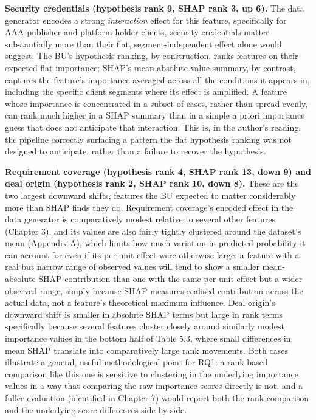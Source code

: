 \textbf{Security credentials (hypothesis rank 9, SHAP rank 3, up 6).}
The data generator encodes a strong \emph{interaction} effect for this
feature, specifically for AAA-publisher and platform-holder clients,
security credentials matter substantially more than their flat,
segment-independent effect alone would suggest. The BU's hypothesis
ranking, by construction, ranks features on their expected flat
importance; SHAP's mean-absolute-value summary, by contrast, captures
the feature's importance averaged across all the conditions it appears
in, including the specific client segments where its effect is
amplified. A feature whose importance is concentrated in a subset of
cases, rather than spread evenly, can rank much higher in a SHAP summary
than in a simple a priori importance guess that does not anticipate that
interaction. This is, in the author's reading, the pipeline correctly
surfacing a pattern the flat hypothesis ranking was not designed to
anticipate, rather than a failure to recover the hypothesis.

\textbf{Requirement coverage (hypothesis rank 4, SHAP rank 13, down 9)
and deal origin (hypothesis rank 2, SHAP rank 10, down 8).} These are
the two largest downward shifts, features the BU expected to matter
considerably more than SHAP finds they do. Requirement coverage's
encoded effect in the data generator is comparatively modest relative to
several other features (Chapter 3), and its values are also fairly
tightly clustered around the dataset's mean (Appendix A), which limits
how much variation in predicted probability it can account for even if
its per-unit effect were otherwise large; a feature with a real but
narrow range of observed values will tend to show a smaller
mean-absolute-SHAP contribution than one with the same per-unit effect
but a wider observed range, simply because SHAP measures realised
contribution across the actual data, not a feature's theoretical maximum
influence. Deal origin's downward shift is smaller in absolute SHAP
terms but large in rank terms specifically because several features
cluster closely around similarly modest importance values in the bottom
half of Table 5.3, where small differences in mean
\textbar SHAP\textbar{} translate into comparatively large rank
movements. Both cases illustrate a general, useful methodological point
for RQ1: a rank-based comparison like this one is sensitive to
clustering in the underlying importance values in a way that comparing
the raw importance scores directly is not, and a fuller evaluation
(identified in Chapter 7) would report both the rank comparison and the
underlying score differences side by side.

